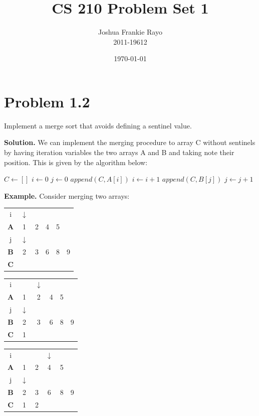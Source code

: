 \documentclass[a4paper, 11pt]{article}
\title{CS 210 Problem Set 1}
\author{Joshua Frankie Rayo\\ 2011-19612}
\date{\today}
\begin{document}
\maketitle

\section{Problem 1.2} 
Implement a merge sort that avoids defining a sentinel value.

\textbf{Solution.} We can implement the merging procedure to array C without sentinels by having iteration variables the two arrays A and B and taking note their position. This is given by the algorithm below:

\begin{algorithmic}
	\State $C\gets []$
	\State $i\gets 0$
	\State $j\gets 0$
	\Repeat
		\State $append(C, A[i])$
		\State $i \gets i+1$
		\EndIf
	\Else
		\State $append(C, B[j])$
		\State $j \gets j+1$
		\EndIf
	\EndIf
	\EndFunction
\end{algorithmic}

\textbf{Example.} Consider merging two arrays:

\begin{center}
	\begin{tabular}{ c c c c c c }
		i & $\downarrow$\\
		\textbf{A} & 1 & 2 & 4 & 5\\
		j & $\downarrow$\\
		\textbf{B} & 2 & 3 & 6 & 8 & 9\\
		\textbf{C} \\
	\end{tabular}
\end{center}

\begin{center}
	\begin{tabular}{ c c c c c c }
		i & & $\downarrow$\\
		\textbf{A} & 1 & 2 & 4 & 5\\
		j & $\downarrow$\\
		\textbf{B} & 2 & 3 & 6 & 8 & 9\\
		\textbf{C} & 1\\
	\end{tabular}
\end{center}

\begin{center}
	\begin{tabular}{ c c c c c c }
		i & & & $\downarrow$\\
		\textbf{A} & 1 & 2 & 4 & 5\\
		j & $\downarrow$\\
		\textbf{B} & 2 & 3 & 6 & 8 & 9\\
		\textbf{C} & 1 & 2\\
	\end{tabular}
\end{center}
\end{document}

